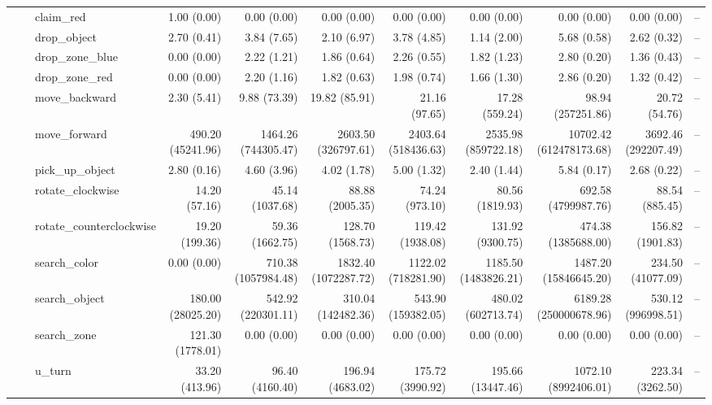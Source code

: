 \begin{table}[t]
{\begin{tabular}{lllrrrrrrrr}
 &  & claim\_red & 1.00 (0.00) & 0.00 (0.00) & 0.00 (0.00) & 0.00 (0.00) & 0.00 (0.00) & 0.00 (0.00) & 0.00 (0.00) & -- \\
 &  & drop\_object & 2.70 (0.41) & 3.84 (7.65) & 2.10 (6.97) & 3.78 (4.85) & 1.14 (2.00) & 5.68 (0.58) & 2.62 (0.32) & -- \\
 &  & drop\_zone\_blue & 0.00 (0.00) & 2.22 (1.21) & 1.86 (0.64) & 2.26 (0.55) & 1.82 (1.23) & 2.80 (0.20) & 1.36 (0.43) & -- \\
 &  & drop\_zone\_red & 0.00 (0.00) & 2.20 (1.16) & 1.82 (0.63) & 1.98 (0.74) & 1.66 (1.30) & 2.86 (0.20) & 1.32 (0.42) & -- \\
 &  & move\_backward & 2.30 (5.41) & 9.88 (73.39) & 19.82 (85.91) & 21.16 (97.65) & 17.28 (559.24) & 98.94 (257251.86) & 20.72 (54.76) & -- \\
 &  & move\_forward & 490.20 (45241.96) & 1464.26 (744305.47) & 2603.50 (326797.61) & 2403.64 (518436.63) & 2535.98 (859722.18) & 10702.42 (612478173.68) & 3692.46 (292207.49) & -- \\
 &  & pick\_up\_object & 2.80 (0.16) & 4.60 (3.96) & 4.02 (1.78) & 5.00 (1.32) & 2.40 (1.44) & 5.84 (0.17) & 2.68 (0.22) & -- \\
 &  & rotate\_clockwise & 14.20 (57.16) & 45.14 (1037.68) & 88.88 (2005.35) & 74.24 (973.10) & 80.56 (1819.93) & 692.58 (4799987.76) & 88.54 (885.45) & -- \\
 &  & rotate\_counterclockwise & 19.20 (199.36) & 59.36 (1662.75) & 128.70 (1568.73) & 119.42 (1938.08) & 131.92 (9300.75) & 474.38 (1385688.00) & 156.82 (1901.83) & -- \\
 &  & search\_color & 0.00 (0.00) & 710.38 (1057984.48) & 1832.40 (1072287.72) & 1122.02 (718281.90) & 1185.50 (1483826.21) & 1487.20 (15846645.20) & 234.50 (41077.09) & -- \\
 &  & search\_object & 180.00 (28025.20) & 542.92 (220301.11) & 310.04 (142482.36) & 543.90 (159382.05) & 480.02 (602713.74) & 6189.28 (250000678.96) & 530.12 (996998.51) & -- \\
 &  & search\_zone & 121.30 (1778.01) & 0.00 (0.00) & 0.00 (0.00) & 0.00 (0.00) & 0.00 (0.00) & 0.00 (0.00) & 0.00 (0.00) & -- \\
 &  & u\_turn & 33.20 (413.96) & 96.40 (4160.40) & 196.94 (4683.02) & 175.72 (3990.92) & 195.66 (13447.46) & 1072.10 (8992406.01) & 223.34 (3262.50) & -- \\
\hline
\end{tabular}}
\end{table}

